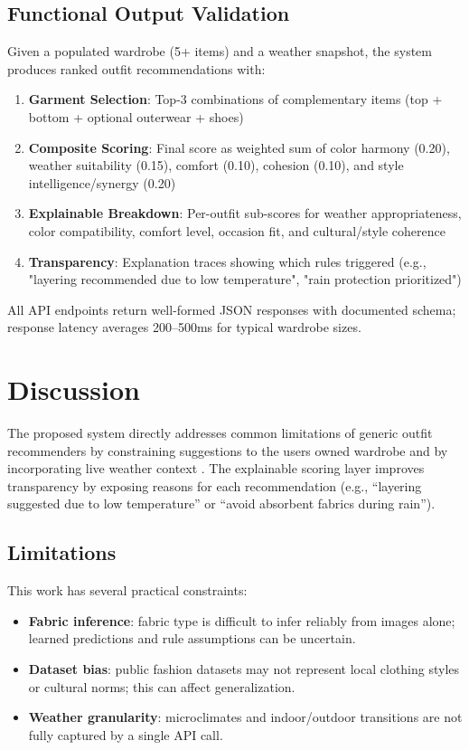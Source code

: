 \documentclass[stu,man]{apa7}
\begin{document}
\subsection{Functional Output Validation}
Given a populated wardrobe (5+ items) and a weather snapshot, the system produces ranked outfit recommendations with:
\begin{enumerate}
  \item \textbf{Garment Selection}: Top-3 combinations of complementary items (top + bottom + optional outerwear + shoes)
  \item \textbf{Composite Scoring}: Final score as weighted sum of color harmony (0.20), weather suitability (0.15), comfort (0.10), cohesion (0.10), and style intelligence/synergy (0.20)
  \item \textbf{Explainable Breakdown}: Per-outfit sub-scores for weather appropriateness, color compatibility, comfort level, occasion fit, and cultural/style coherence
  \item \textbf{Transparency}: Explanation traces showing which rules triggered (e.g., "layering recommended due to low temperature", "rain protection prioritized")
\end{enumerate}

All API endpoints return well-formed JSON responses with documented schema; response latency averages 200--500ms for typical wardrobe sizes.

\section{Discussion}
The proposed system directly addresses common limitations of generic outfit recommenders by constraining suggestions to the user\textquotesingle s owned wardrobe and by incorporating live weather context \parencite{openweatherapi}.
The explainable scoring layer improves transparency by exposing reasons for each recommendation (e.g., “layering suggested due to low temperature” or “avoid absorbent fabrics during rain”).

\subsection{Limitations}
This work has several practical constraints:
\begin{itemize}
  \item \textbf{Fabric inference}: fabric type is difficult to infer reliably from images alone; learned predictions and rule assumptions can be uncertain.
  \item \textbf{Dataset bias}: public fashion datasets may not represent local clothing styles or cultural norms; this can affect generalization.
  \item \textbf{Weather granularity}: microclimates and indoor/outdoor transitions are not fully captured by a single API call.
\end{itemize}
\end{document}
